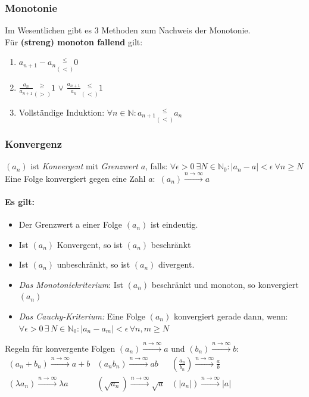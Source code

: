 \documentclass[6pt,a4paper]{scrartcl}
\newcommand{\abs}[1]{\ensuremath{\left\vert#1\right\vert}}
\begin{document}
\begin{multicols*}{4}
\subsubsection{Monotonie}
Im Wesentlichen gibt es 3 Methoden zum Nachweis der Monotonie.\\
Für \textbf{(streng) monoton fallend} gilt:
\begin{enumerate}\itemsep0pt
\item $a_{n+1} - a_n \underset{(<)}{^{\le}} 0$
\item $\frac{a_n}{a_{n+1}} \underset{(>)}{^{\ge}} 1$ \qquad $\lor$ \qquad $\frac{a_{n+1}}{a_n} \underset{(<)}{^{\le}} 1$
\item Vollständige Induktion: $\forall n \in \mathbb{N}: a_{n+1}\underset{(<)}{^{\le}} a_n$
\end{enumerate}
\subsubsection{Konvergenz}
$(a_n)$ ist \emph{Konvergent} mit \emph{Grenzwert} $a$, falls: $\forall \epsilon > 0 \ \exists N  \in \mathbb N_0:  \abs{a_n -a} < \epsilon \ \forall n \ge N$\\
Eine Folge konvergiert gegen eine Zahl $a$:\ $(a_n) \overset{n \rightarrow \infty}{\longrightarrow} a$
\paragraph{Es gilt:}
\begin{itemize}\itemsep0pt
\item Der Grenzwert a einer Folge $(a_n)$ ist eindeutig.
\item Ist $(a_n)$ Konvergent, so ist $(a_n)$ beschränkt
\item Ist $(a_n)$ unbeschränkt, so ist $(a_n)$ divergent.
\item \emph{Das Monotoniekriterium}: Ist $(a_n)$ beschränkt und monoton, so konvergiert $(a_n)$
\item \emph{Das Cauchy-Kriterium:} Eine Folge $(a_n)$ konvergiert gerade dann, wenn: \\ $\forall \epsilon >0 \, \exists \,  N \in \mathbb N_0: \abs{a_n - a_m} < \epsilon \, \forall n, m \ge N$
\end{itemize}
Regeln für konvergente Folgen $(a_n) \overset{n \rightarrow \infty}{\longrightarrow} a$ und $(b_n) \overset{n \rightarrow \infty}{\longrightarrow} b$:\\
$\begin{array}{lll}
(a_n+b_n) \overset{n \rightarrow \infty}{\longrightarrow} a+b & (a_n b_n) \overset{n \rightarrow \infty}{\longrightarrow} ab & (\frac{a_n}{b_n}) \overset{n \rightarrow \infty}{\longrightarrow} \frac{a}{b}\\
(\lambda a_n) \overset{n \rightarrow \infty}{\longrightarrow} \lambda a & (\sqrt{a_n}) \overset{n \rightarrow \infty}{\longrightarrow} \sqrt{a} & (|a_n|) \overset{n \rightarrow \infty}{\longrightarrow} |a|
\end{array}$

\end{multicols*}
\end{document}
